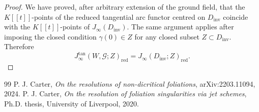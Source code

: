 \documentclass[10pt,a4paper]{amsart}
\numberwithin{equation}{section}
\newcommand{\red}{\mathrm{red}}
\newcommand{\Dinv}{D_{\mathrm{inv}}}
\newcommand{\cG}{\mathcal G}
\def\bibaut#1{{\sc #1}}
\begin{document}
\begin{proof}
We have proved, after arbitrary extension of the ground field, that the
\(K[[t]]\)-points of the reduced tangential arc functor centred on
\(\Dinv\) coincide with the \(K[[t]]\)-points of \(J_\infty(\Dinv)\).  The
same argument applies after imposing the closed condition \(\gamma(0)\in Z\)
for any closed subset \(Z\subset\Dinv\).  Therefore
\[
J_\infty^{\tan}(W,\cG;Z)_{\red}
=
J_\infty(\Dinv;Z)_{\red}.
\]
 
\end{proof}


\begin{thebibliography}{99}
 \bibaut{P. J. Carter}, \emph{On the resolutions of non-dicritical foliations}, arXiv:2203.11094, 2024.
 \bibaut{P. J. Carter}, \emph{On the resolution of foliation singularities via jet schemes}, Ph.D. thesis, University of Liverpool, 2020.
\end{thebibliography}
\end{document}

